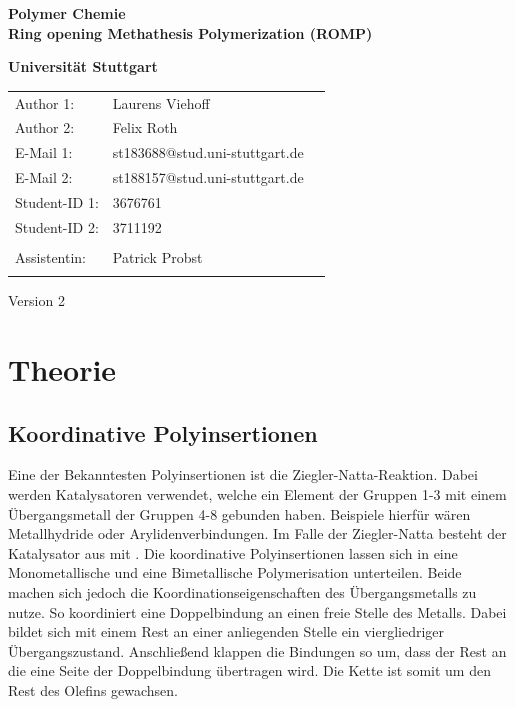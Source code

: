\documentclass[10pt,a4paper,ngerman]{scrartcl}
\begin{document}
\begin{titlepage}
	\vspace*{2,5cm}
	\begin{center}
		\begin{LARGE}
			\textbf{Polymer Chemie}\\
			\textbf{Ring opening Methathesis Polymerization (ROMP)}\\
		\end{LARGE}
		\vspace{1cm}
		\textbf{Universität Stuttgart}\\
		\vspace*{1,5cm}
		\begin{tabular}{lp{}l}
			Author 1:     &Laurens Viehoff\\
            Author 2:     &Felix Roth\\   
			E-Mail 1:      &st183688@stud.uni-stuttgart.de\\
            E-Mail 2:      &st188157@stud.uni-stuttgart.de  \\
			Student-ID 1: & 3676761   \\ 
            Student-ID 2: & 3711192 \\ \\
			Assistentin:  & Patrick Probst  \\ \\ 
		\end{tabular}
		
		\vspace{2cm}
		Version 2\\
	\end{center}

    
\end{titlepage}
\thispagestyle{empty}
\renewcommand{\thepage}{\arabic{page}}
\newpage
\tableofcontents
\setcounter{page}{1}
\renewcommand{\thepage}{\arabic{page}}
\newpage


\section{Theorie}

	\subsection{Koordinative Polyinsertionen}

		Eine der Bekanntesten Polyinsertionen ist die Ziegler-Natta-Reaktion.
		Dabei werden Katalysatoren verwendet, welche ein Element der Gruppen 1-3 mit einem Übergangsmetall der Gruppen 4-8 gebunden haben.
		Beispiele hierfür wären Metallhydride oder Arylidenverbindungen. 
		Im Falle der Ziegler-Natta besteht der Katalysator aus  mit .
		Die koordinative Polyinsertionen lassen sich in eine Monometallische und eine Bimetallische Polymerisation unterteilen.
		Beide machen sich jedoch die Koordinationseigenschaften des Übergangsmetalls zu nutze.
		So koordiniert eine Doppelbindung an einen freie Stelle des Metalls. 
		Dabei bildet sich mit einem Rest an einer anliegenden Stelle ein viergliedriger Übergangszustand.
		Anschließend klappen die Bindungen so um, dass der Rest an die eine Seite der Doppelbindung übertragen wird.
		Die Kette ist somit um den Rest des Olefins gewachsen.
\end{document}
